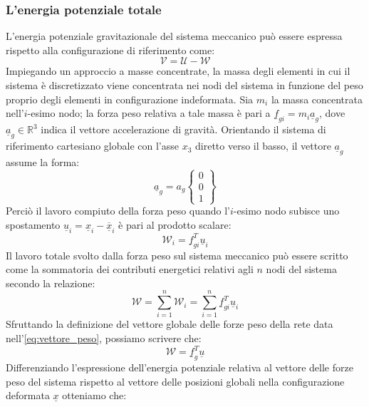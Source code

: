 \subsubsection{L'energia potenziale totale}
L'energia potenziale gravitazionale del sistema meccanico può essere espressa rispetto alla configurazione di riferimento come:
\begin{equation}
   \mathcal{V} = \mathcal{U} - \mathcal{W}
   \label{eq:energia_potenziale_totale}
\end{equation}
Impiegando un approccio a masse concentrate, la massa degli elementi in cui il sistema è discretizzato viene concentrata nei nodi del sistema in funzione del peso proprio degli elementi in configurazione indeformata. Sia $m_i$ la massa concentrata nell'$i$-esimo nodo; la forza peso relativa a tale massa è pari a $\underline{f}_{gi} = m_i\underline{a}_g$, dove $\underline{a}_g \in \mathbb{R}^3$ indica il vettore accelerazione di gravità. Orientando il sistema di riferimento cartesiano globale con l'asse $x_3$ diretto verso il basso, il vettore $\underline{a}_g$ assume la forma:
\begin{equation}
   \underline{a}_g = a_g
   \left\{
   \begin{array}{c}
   0 \\
   0 \\
   1
   \end{array}
   \right\}
\end{equation}
Perciò il lavoro compiuto della forza peso quando l'$i$-esimo nodo subisce uno spostamento $\underline{u}_i = \underline{x}_i - \overline{\underline{x}}_i$ è pari al prodotto scalare:
\begin{equation}
   \mathcal{W}_i = \underline{f}_{gi}^{T} \underline{u}_i
\end{equation}
Il lavoro totale svolto dalla forza peso sul sistema meccanico può essere scritto come la sommatoria dei contributi energetici relativi agli $n$ nodi del sistema secondo la relazione: 
\begin{equation}
   \mathcal{W} = \sum_{i=1}^{n} \mathcal{W}_i = \sum_{i=1}^{n} \underline{f}_{gi}^{T} \underline{u}_i 
\end{equation} 
Sfruttando la definizione del vettore globale delle forze peso della rete data nell'\cref{eq:vettore_peso}, possiamo scrivere che:
\begin{equation}
   \mathcal{W} = \underline{f}_g^T \underline{u}
\end{equation}
Differenziando l'espressione dell'energia potenziale relativa al vettore delle forze peso del sistema rispetto al vettore delle posizioni globali nella configurazione deformata $\underline{x}$ otteniamo che: 
